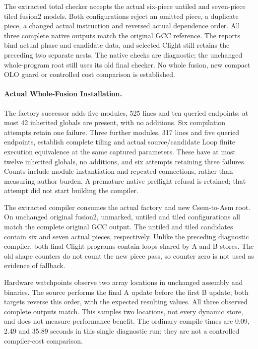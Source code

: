 The extracted total checker accepts the actual six-piece untiled and seven-piece
tiled fusion2 models. Both configurations reject an omitted piece, a duplicate
piece, a changed actual instruction and reversed actual dependence order.
All three complete native outputs match the original GCC reference. The reports
bind actual phase and candidate data, and selected Clight still retains the
preceding two separate nests. The native checks are diagnostic; the unchanged
whole-program root still uses its old final checker. No whole fusion, new compact
OLO guard or controlled cost comparison is established.

\paragraph{Actual Whole-Fusion Installation.}
The factory successor adds five modules, 525 lines and ten queried endpoints;
at most 42 inherited globals are present, with no additions. Six compilation
attempts retain one failure. Three further modules, 317 lines and five queried
endpoints, establish complete tiling and actual source/candidate Loop finite
execution equivalence at the same captured parameters. These have at most
twelve inherited globals, no additions, and six attempts retaining three
failures. Counts include module instantiation and repeated connections, rather
than measuring author burden. A premature native preflight refusal is retained;
that attempt did not start building the compiler.

The extracted compiler consumes the actual factory and new Csem-to-Asm root.
On unchanged original fusion2, unmarked, untiled and tiled configurations all
match the complete original GCC output. The untiled and tiled candidates contain
six and seven actual pieces, respectively. Unlike the preceding diagnostic
compiler, both final Clight programs contain loops shared by A and B stores.
The old shape counters do not count the new piece pass, so counter zero is not
used as evidence of fallback.

Hardware watchpoints observe two array locations in unchanged assembly and
binaries. The source performs the final A update before the first B update;
both targets reverse this order, with the expected resulting values. All three
observed complete outputs match. This samples two locations, not every dynamic
store, and does not measure performance benefit. The ordinary compile times
are 0.09, 2.49 and 35.89 seconds in this single diagnostic run; they are not a
controlled compiler-cost comparison.

